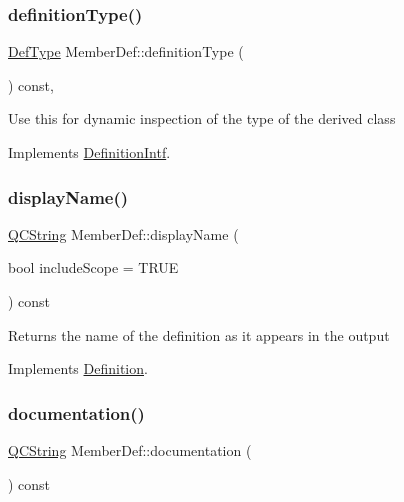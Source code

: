 \subsubsection{\texorpdfstring{definitionType()}{definitionType()}}
{\footnotesize\ttfamily \mbox{\hyperlink{class_definition_intf_ada60114bc621669dd8c19edfc6421766}{Def\+Type}} Member\+Def\+::definition\+Type (\begin{DoxyParamCaption}{ }\end{DoxyParamCaption}) const\hspace{0.3cm}{\ttfamily [inline]}, {\ttfamily [virtual]}}

Use this for dynamic inspection of the type of the derived class 

Implements \mbox{\hyperlink{class_definition_intf_ac8ee00bc1af5558ae37f6896d16f5a3a}{Definition\+Intf}}.

\mbox{\label{class_member_def_a3c91c8522caa2b1905cd52b3eedad8fa}} 
\subsubsection{\texorpdfstring{displayName()}{displayName()}}
{\footnotesize\ttfamily \mbox{\hyperlink{class_q_c_string}{Q\+C\+String}} Member\+Def\+::display\+Name (\begin{DoxyParamCaption}\item[{bool}]{include\+Scope = {\ttfamily TRUE} }\end{DoxyParamCaption}) const\hspace{0.3cm}{\ttfamily [virtual]}}

Returns the name of the definition as it appears in the output 

Implements \mbox{\hyperlink{class_definition_ac4741f70f06baac174cf71b3e11d06ac}{Definition}}.

\mbox{\label{class_member_def_a0a534c3dba8dced3afa746c535afb59b}} 
\subsubsection{\texorpdfstring{documentation()}{documentation()}}
{\footnotesize\ttfamily \mbox{\hyperlink{class_q_c_string}{Q\+C\+String}} Member\+Def\+::documentation (\begin{DoxyParamCaption}{ }\end{DoxyParamCaption}) const\hspace{0.3cm}{\ttfamily [virtual]}}

